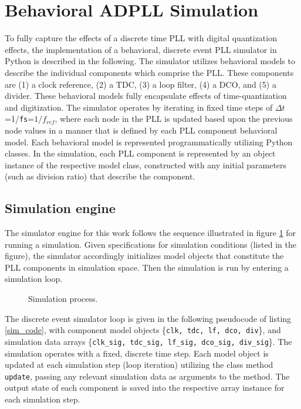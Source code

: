 \pagebreak
\section{Behavioral ADPLL Simulation}\label{simulator}
To fully capture the effects of a discrete time PLL with digital quantization effects, the implementation of a behavioral, discrete event PLL simulator in Python is described in the following. The simulator utilizes behavioral models to describe the individual components which comprise the PLL. These components are (1) a clock reference, (2) a TDC, (3) a loop filter, (4) a DCO, and (5) a divider. These behavioral models fully encapsulate effects of time-quantization and digitization. The simulator operates by iterating in fixed time steps of $\Delta t$=1/\texttt{fs}=$1/f_{ref}$, where each node in the PLL is updated based upon the previous node values in a manner that is defined by each PLL component behavioral model. Each behavioral model is represented programmatically utilizing Python classes. In the simulation, each PLL component is represented by an object instance of the respective model class, constructed with any initial parameters (such as division ratio) that describe the component.
\subsection{Simulation engine}
The simulator engine for this work follows the sequence illustrated in figure \ref{fig:simulator} for running a simulation. Given specifications for simulation conditions (listed in the figure), the simulator accordingly initializes model objects that constitute the PLL components in simulation space. Then the simulation is run by entering a simulation loop. 
\begin{figure}[htb!]
	\center
	\caption{Simulation process.}
	\label{fig:simulator}
\end{figure}
\FloatBarrier
The discrete event simulator loop is given in the following pseudocode of listing \ref{sim_code}, with component model objects \{\texttt{clk, tdc, lf, dco, div}\}, and simulation data arrays \{\texttt{clk\_sig, tdc\_sig, lf\_sig, dco\_sig, div\_sig}\}. The simulation operates with a fixed, discrete time step. Each model object is updated at each simulation step (loop iteration) utilizing the class method \texttt{update}, passing any relevant simulation data as arguments to the method. The output state of each component is saved into the respective array instance for each simulation step. 

